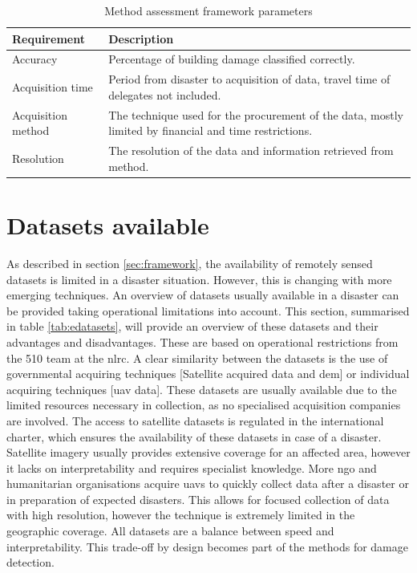 \begin{table}[!h]
	\centering
	\captionsetup{justification=raggedright,singlelinecheck=false}
	\caption{\footnotesize{Method assessment framework parameters}}
	\begin{footnotesize}
		\begin{tabular}{p{3cm}p{8cm}}
			\toprule
			Requirement & Description \\
			\midrule
			Accuracy & Percentage of building damage classified correctly.\\
			Acquisition time & Period from disaster to acquisition of data, travel time of delegates not included.\\
			Acquisition method & The technique used for the procurement of the data, mostly limited by financial and time restrictions. \\
			Resolution & The resolution of the data and information retrieved from method.\\
			\bottomrule
		\end{tabular}
	\end{footnotesize}
	\label{tab:frame}
\end{table}

\section{Datasets available} \label{sec:datas}
As described in section \ref{sec:framework}, the availability of remotely sensed datasets is limited in a disaster situation. However, this is changing with more emerging techniques. An overview of datasets usually available in a disaster can be provided taking operational limitations into account. This section, summarised in table \ref{tab:edatasets}, will provide an overview of these datasets and their advantages and disadvantages. These are based on operational restrictions from the 510 team at the \ac{nlrc}. A clear similarity between the datasets is the use of governmental acquiring techniques [Satellite acquired data and \ac{dem}] or individual acquiring techniques [\ac{uav} data]. These datasets are usually available due to the limited resources necessary in collection, as no specialised acquisition companies are involved. The access to satellite datasets is regulated in the international charter, which ensures the availability of these datasets in case of a disaster. Satellite imagery usually provides extensive coverage for an affected area, however it lacks on interpretability and requires specialist knowledge. More \ac{ngo} and humanitarian organisations acquire \ac{uav}s to quickly collect data after a disaster or in preparation of expected disasters. This allows for focused collection of data with high resolution, however the technique is extremely limited in the geographic coverage. All datasets are a balance between speed and interpretability. This trade-off by design becomes part of the methods for damage detection.


